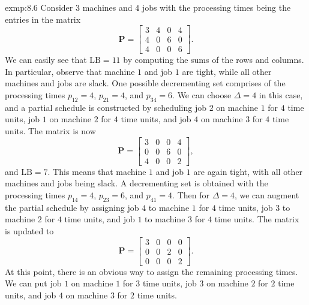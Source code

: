 \begin{exmp}{exmp:8.6}
    Consider $3$ machines and $4$ jobs with the processing times being 
    the entries in the matrix 
    \[ \mathbf P = \begin{bmatrix}
        3 & 4 & 0 & 4 \\ 
        4 & 0 & 6 & 0 \\ 
        4 & 0 & 0 & 6
    \end{bmatrix}. \] 
    We can easily see that $\text{LB} = 11$ by computing the sums of the 
    rows and columns. In particular, observe that machine $1$ 
    and job $1$ are tight, while all other machines and jobs are slack. One 
    possible decrementing set comprises of the processing times 
    $p_{12} = 4$, $p_{21} = 4$, and $p_{34} = 6$. We can choose 
    $\Delta = 4$ in this case, and a partial schedule is constructed 
    by scheduling job $2$ on machine $1$ for $4$ time units, 
    job $1$ on machine $2$ for $4$ time units, and 
    job $4$ on machine $3$ for $4$ time units. The matrix is now 
    \[ \mathbf P = \begin{bmatrix}
        3 & 0 & 0 & 4 \\ 
        0 & 0 & 6 & 0 \\ 
        4 & 0 & 0 & 2
    \end{bmatrix}, \] 
    and $\text{LB} = 7$. This means that machine $1$ and job $1$ are again 
    tight, with all other machines and jobs being slack. A decrementing set 
    is obtained with the processing times $p_{14} = 4$, $p_{23} = 6$, 
    and $p_{41} = 4$. Then for $\Delta = 4$, we can augment the partial 
    schedule by assigning job $4$ to machine $1$ for $4$ time units, 
    job $3$ to machine $2$ for $4$ time units, and job $1$ to machine $3$ 
    for $4$ time units. The matrix is updated to 
    \[ \mathbf P = \begin{bmatrix}
        3 & 0 & 0 & 0 \\ 
        0 & 0 & 2 & 0 \\ 
        0 & 0 & 0 & 2
    \end{bmatrix}. \] 
    At this point, there is an obvious way to assign the remaining 
    processing times. We can put job $1$ on machine $1$ for $3$ time units, 
    job $3$ on machine $2$ for $2$ time units, and job $4$ on machine $3$ 
    for $2$ time units.
\end{exmp}

